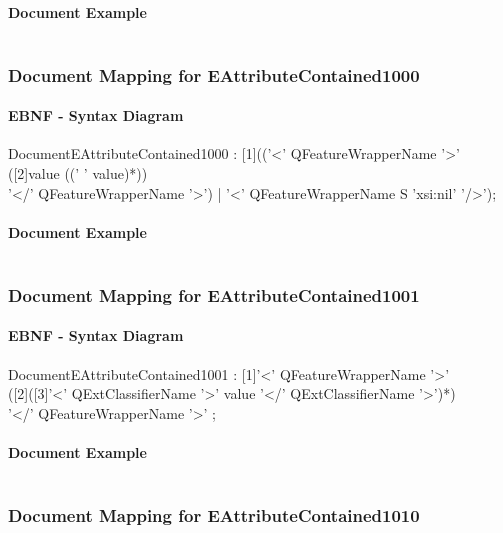 \documentclass[11pt,a4paper]{article}
\begin{document}
\paragraph{Document Example}
\inputminted[fontsize=\footnotesize]{xml}{examples/EAttributeContained0111.xml}

\subsubsection{Document Mapping for EAttributeContained1000}
\paragraph{EBNF - Syntax Diagram}
\begin{rail}
DocumentEAttributeContained1000 : [1](('<' QFeatureWrapperName '>' \\
([2]value ((' ' value)*)) \\
'</' QFeatureWrapperName '>')
 | '<' QFeatureWrapperName S 'xsi:nil' '/>');
\end{rail}

\paragraph{Document Example}
\inputminted[fontsize=\footnotesize]{xml}{examples/EAttributeContained1000.xml}


\subsubsection{Document Mapping for EAttributeContained1001}
\paragraph{EBNF - Syntax Diagram}
\begin{rail}
DocumentEAttributeContained1001 : [1]'<' QFeatureWrapperName '>' \\
([2]([3]'<' QExtClassifierName '>' value '</' QExtClassifierName '>')*) \\
'</' QFeatureWrapperName '>' ;
\end{rail}

\paragraph{Document Example}
\inputminted[fontsize=\footnotesize]{xml}{examples/EAttributeContained1001.xml}


\subsubsection{Document Mapping for EAttributeContained1010}
\end{document}
